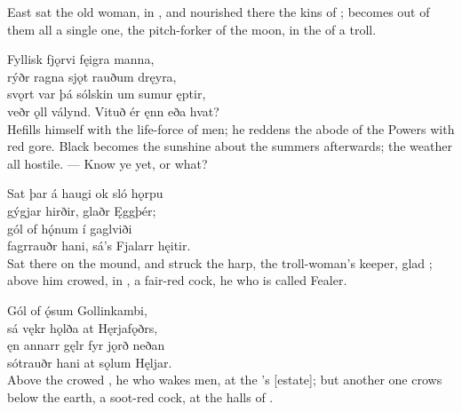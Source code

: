 \bvb East sat the old woman, in , and nourished there the kins of ; becomes out of them all a single one, the pitch-forker of the moon, in the  of a troll.\footnotemark[1]

\bva Fyllisk fjǫrvi \hld fęigra manna, \\%
rýðr ragna sjǫt \hld rauðum dręyra, \\%
svǫrt var þá sólskin \hld um sumur ęptir, \\%
veðr ǫll válynd. \hld Vituð ér ęnn eða hvat?\\%

\bvb He\footnotemark[1] fills himself with the life-force of  men; he reddens the abode of the Powers with red gore. Black becomes the sunshine about the summers afterwards\footnotemark[2]; the weather all hostile. — Know ye yet, or what?

\bva Sat þar á haugi \hld ok sló hǫrpu \\%
gýgjar hirðir, \hld glaðr Ęggþér; \\%
gól of hǫ́num \hld í gaglviði \\%
fagrrauðr hani, \hld sá's Fjalarr hęitir.\\%

\bvb Sat there on the mound, and struck the harp, the troll-woman's keeper, glad ; above him crowed, in , a fair-red cock, he who is called Fealer.

\bva Gól of ǫ́sum \hld Gollinkambi, \\%
sá vękr hǫlða \hld at Hęrjafǫðrs, \\%
ęn annarr gęlr \hld fyr jǫrð neðan \\%
sótrauðr hani \hld at sǫlum Hęljar.\\%

\bvb Above the  crowed , he who wakes men, at the ’s [estate]; but another one crows below the earth, a soot-red cock, at the halls of .\footnotemark[1]

